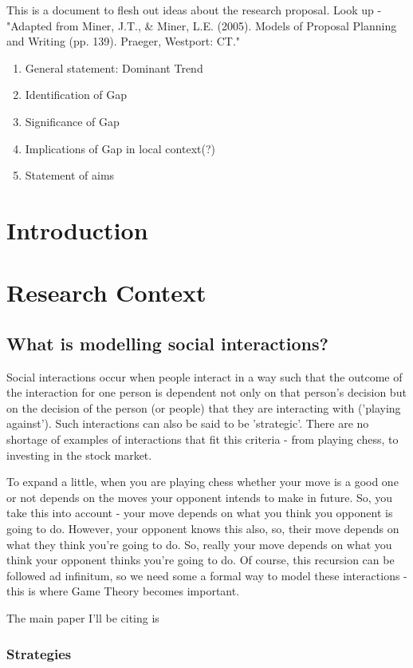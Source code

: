 \documentclass{article}
\begin{document}
This is a document to flesh out ideas about the research proposal. \newline
Look up -  "Adapted from Miner, J.T., \& Miner, L.E. (2005). Models of Proposal Planning and Writing (pp. 139). Praeger, Westport: CT."
\begin{enumerate}
    \item General statement: Dominant Trend
    \item Identification of Gap
    \item Significance of Gap
    \item Implications of Gap in local context(?)
    \item Statement of aims
\end{enumerate}
\section{Introduction}
\section{Research Context}
\subsection{What is modelling social interactions?}
Social interactions occur when people interact in a way such that the outcome of the interaction for
one person is dependent not  only on that person's decision but on the decision of the person (or
people) that they are interacting with ('playing against'). Such interactions can also be said to be
'strategic'. There are no shortage of examples of interactions that fit this criteria - from playing
chess, to investing in the stock market.

To expand a little, when you are playing chess whether your
move is a good one or not depends on the moves your opponent intends to make in future. So, you take
this into account - your move depends on what you think you opponent is going to do. However, your
opponent knows this also, so, their move depends on what they think you're going to do. So, really
your move depends on what you think your opponent thinks you're going to do. Of course, this
recursion can be followed ad infinitum, so we need some a formal way to model these interactions -
this is where Game Theory becomes important.

The main paper I'll be citing is \cite{alger2013homo}

\subsubsection{Strategies}
\end{document}
